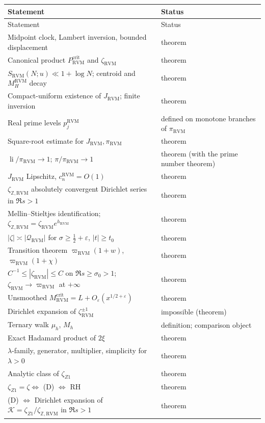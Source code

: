 \documentclass[11pt,reqno]{amsart}
\numberwithin{equation}{section}
\theoremstyle{plain}
\theoremstyle{definition}
\theoremstyle{remark}
\newcommand{\Z}{\mathbb Z}
\newcommand{\eps}{\varepsilon}
\newcommand{\li}{\operatorname{li}}
\newcommand{\RVM}{\mathrm{RVM}}
\newcommand{\crit}{\mathrm{crit}}
\begin{document}
\begingroup\small
\begin{longtable}{p{}p{}}
\toprule
Statement & Status\\
\midrule
\endfirsthead
\toprule
Statement & Status\\
\midrule
\endhead
\bottomrule
\endfoot
Midpoint clock, Lambert inversion, bounded displacement & theorem\\
Canonical product $P_{\RVM}^{\crit}$ and $\zeta_{\RVM}$ & theorem\\
$S_{\RVM}(N;u)\ll1+\log N$; centroid and $M_H^{\RVM}$ decay & theorem\\
Compact-uniform existence of $J_{\RVM}$; finite inversion & theorem\\
Real prime levels $p_j^{\RVM}$ & defined on monotone branches of $\pi_{\RVM}$\\
Square-root estimate for $J_{\RVM},\pi_{\RVM}$ & theorem\\
$\li/\pi_{\RVM}\to1$; $\pi/\pi_{\RVM}\to1$ & theorem (with the prime number theorem)\\
$J_{\RVM}$ Lipschitz, $c_n^{\RVM}=O(1)$ & theorem\\
$\zeta_{\Z,\RVM}$ absolutely convergent Dirichlet series in $\Re s>1$ & theorem\\
Mellin--Stieltjes identification; $\zeta_{\Z,\RVM}=\zeta_{\RVM}e^{h_{\RVM}}$ & theorem\\
$|\zeta|\asymp|\mathcal Q_{\RVM}|$ for $\sigma\ge\frac12+\eps$, $|t|\ge t_0$ & theorem\\
Transition theorem $\varpi_{\RVM}(1+w)$, $\varpi_{\RVM}(1+\chi)$ & theorem\\
$C^{-1}\le|\zeta_{\RVM}|\le C$ on $\Re s\ge\sigma_0>1$; $\zeta_{\RVM}\to\varpi_{\RVM}$ at $+\infty$ & theorem\\
Unsmoothed $M_{\RVM}^{\crit}=L+O_\eps(x^{1/2+\eps})$ & theorem\\
Dirichlet expansion of $\zeta_{\RVM}^{\pm1}$ & impossible (theorem)\\
Ternary walk $\mu_h$, $M_h$ & definition; comparison object\\
Exact Hadamard product of $2\xi$ & theorem\\
$\lambda$-family, generator, multiplier, simplicity for $\lambda>0$ & theorem\\
Analytic class of $\zeta_{Z1}$ & theorem\\
$\zeta_{Z1}=\zeta\Leftrightarrow$ (D) $\Leftrightarrow$ RH & theorem\\
(D) $\Leftrightarrow$ Dirichlet expansion of $\mathcal K=\zeta_{Z1}/\zeta_{\Z,\RVM}$ in $\Re s>1$ & theorem\\

\end{longtable}
\end{document}
